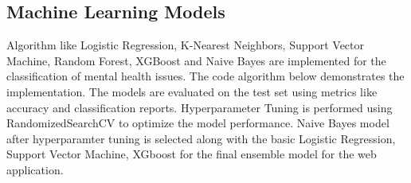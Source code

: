 
\subsection{Machine Learning Models}

Algorithm like Logistic Regression, K-Nearest Neighbors, Support Vector Machine, Random Forest, XGBoost and Naive Bayes are implemented for the classification of mental health issues. The code algorithm below demonstrates the implementation. The models are evaluated on the test set using metrics like accuracy and classification reports. Hyperparameter Tuning is performed using RandomizedSearchCV to optimize the model performance. Naive Bayes model after hyperparamter tuning is selected along with the basic Logistic Regression, Support Vector Machine, XGboost for the final ensemble model for the web application. 

